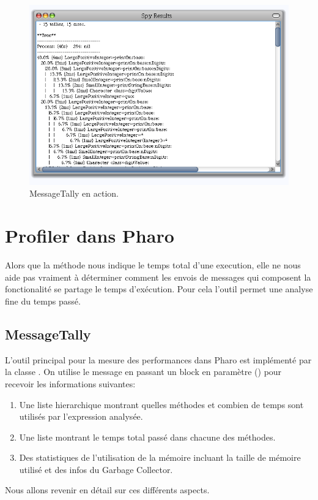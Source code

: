 \documentclass[a4paper,10pt,twoside]{book}
\begin{document}
\begin{figure}
	\begin{center}
	\includegraphics[width=.8\linewidth]{MessageTallyOne}
	\caption{MessageTally en action.}
	\end{center}
\end{figure}


\section{Profiler dans Pharo} 

Alors que la m\'ethode  nous indique le temps total d'une execution, elle ne nous aide pas vraiment \`a d\'eterminer comment les envois de messages qui composent la fonctionalit\'e se partage le temps d'ex\'ecution.
Pour cela l'outil  permet une analyse fine du temps pass\'e. 


\subsection{MessageTally}
L'outil principal pour la mesure des performances dans Pharo est impl\'ement\'e par la classe . On utilise le message  en passant un block en param\`etre () pour recevoir les informations suivantes:

\begin{enumerate}
\item Une liste hierarchique montrant quelles m\'ethodes et combien de temps sont utilis\'es par l'expression analys\'ee.
\item Une liste montrant le temps total pass\'e dans chacune des m\'ethodes.
\item Des statistiques de l'utilisation de la m\'emoire incluant la taille de m\'emoire utilis\'e et des infos du Garbage Collector.
\end{enumerate}
Nous allons revenir en d\'etail sur ces diff\'erents aspects.
\end{document}
